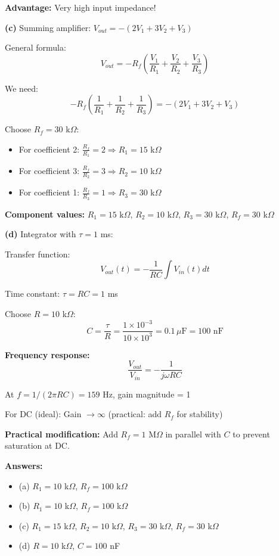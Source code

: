 \documentclass[12pt,a4paper]{article}
\begin{document}
\begin{solution}
\textbf{Advantage:} Very high input impedance!

\textbf{(c)} Summing amplifier: $V_{out} = -(2V_1 + 3V_2 + V_3)$

General formula:
$$V_{out} = -R_f\left(\frac{V_1}{R_1} + \frac{V_2}{R_2} + \frac{V_3}{R_3}\right)$$

We need:
$$-R_f\left(\frac{1}{R_1} + \frac{1}{R_2} + \frac{1}{R_3}\right) = -(2V_1 + 3V_2 + V_3)$$

Choose $R_f = 30$ k$\Omega$:
\begin{itemize}
    \item For coefficient 2: $\frac{R_f}{R_1} = 2 \Rightarrow R_1 = 15$ k$\Omega$
    \item For coefficient 3: $\frac{R_f}{R_2} = 3 \Rightarrow R_2 = 10$ k$\Omega$
    \item For coefficient 1: $\frac{R_f}{R_3} = 1 \Rightarrow R_3 = 30$ k$\Omega$
\end{itemize}

\textbf{Component values:}
$R_1 = 15$ k$\Omega$, $R_2 = 10$ k$\Omega$, $R_3 = 30$ k$\Omega$, $R_f = 30$ k$\Omega$

\textbf{(d)} Integrator with $\tau = 1$ ms:

Transfer function:
$$V_{out}(t) = -\frac{1}{RC}\int V_{in}(t)dt$$

Time constant: $\tau = RC = 1$ ms

Choose $R = 10$ k$\Omega$:
$$C = \frac{\tau}{R} = \frac{1 \times 10^{-3}}{10 \times 10^3} = 0.1\,\mu\text{F} = 100\text{ nF}$$

\textbf{Frequency response:}
$$\frac{V_{out}}{V_{in}} = -\frac{1}{j\omega RC}$$

At $f = 1/(2\pi RC) = 159$ Hz, gain magnitude = 1

For DC (ideal): Gain $\to \infty$ (practical: add $R_f$ for stability)

\textbf{Practical modification:}
Add $R_f = 1$ M$\Omega$ in parallel with $C$ to prevent saturation at DC.

\textbf{Answers:}
\begin{itemize}
    \item (a) $R_1 = 10$ k$\Omega$, $R_f = 100$ k$\Omega$
    \item (b) $R_1 = 10$ k$\Omega$, $R_f = 100$ k$\Omega$
    \item (c) $R_1 = 15$ k$\Omega$, $R_2 = 10$ k$\Omega$, $R_3 = 30$ k$\Omega$, $R_f = 30$ k$\Omega$
    \item (d) $R = 10$ k$\Omega$, $C = 100$ nF
\end{itemize}
\end{solution}
\end{document}
